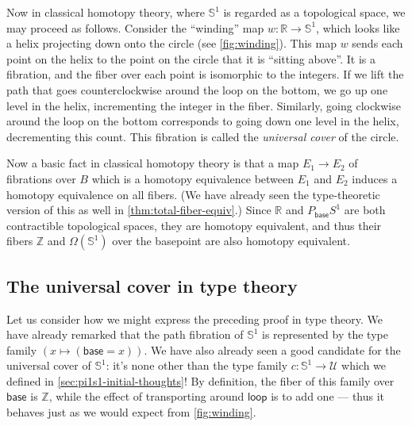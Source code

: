 \documentclass[10pt,a4paper]{article}
\providecommand{\index}[1]{}
\newcommand{\UU}{\ensuremath{\mathcal{U}}\xspace}
\let\type\UU
\newcommand{\Sn}{\mathbb{S}}
\newcommand{\base}{\ensuremath{\mathsf{base}}\xspace}
\newcommand{\lloop}{\ensuremath{\mathsf{loop}}\xspace}
\newcommand{\Z}{\ensuremath{\mathbb{Z}}\xspace}
\theoremstyle{definition}
\theoremstyle{remark}
\numberwithin{equation}{section}
\begin{document}
Now in classical homotopy theory, where $\Sn^1$ is regarded as a topological space, we may proceed as follows.
\index{winding!map}%
Consider the ``winding'' map $w:\mathbb{R}\to \Sn ^1$, which looks like a helix projecting down onto the circle (see \cref{fig:winding}).
This map $w$ sends each point on the helix\index{helix} to the point on the circle that it is ``sitting above''.
It is a fibration, and the fiber over each point is isomorphic to the integers.\index{integers}
If we lift the path that goes counterclockwise around the loop on the bottom, we go up one level in the helix, incrementing the integer in the fiber.
Similarly, going clockwise around the loop on the bottom corresponds to going down one level in the helix, decrementing this count.
This fibration is called the \emph{universal cover} of the circle.
\index{universal!cover}%
\index{cover!universal}%
\index{covering space!universal}%

Now a basic fact in classical homotopy theory is that a map $E_1\to E_2$ of fibrations over $B$ which is a homotopy equivalence between $E_1$ and $E_2$ induces a homotopy equivalence on all fibers.
(We have already seen the type-theoretic version of this as well in \cref{thm:total-fiber-equiv}.)
Since $\mathbb{R}$ and $P_{\base} S^1$ are both contractible topological spaces, they are homotopy equivalent, and thus their fibers $\Z$ and $\Omega(\Sn ^1)$ over the basepoint are also homotopy equivalent.

\index{classical!homotopy theory|)}%

\subsection{The universal cover in type theory}
\label{sec:pi1s1-universal-cover}

\index{universal!cover|(}%
\index{cover!universal|(}%
\index{covering space!universal|(}%

Let us consider how we might express the preceding proof in type theory.
We have already remarked that the path fibration of $\Sn^1$ is represented by the type family $(x\mapsto (\base=x))$.
We have also already seen a good candidate for the universal cover of $\Sn^1$: it's none other than the type family $c:\Sn^1\to\type$ which we defined in \cref{sec:pi1s1-initial-thoughts}!
By definition, the fiber of this family over $\base$ is $\Z$, while the effect of transporting around $\lloop$ is to add one --- thus it behaves just as we would expect from \cref{fig:winding}.
\end{document}
